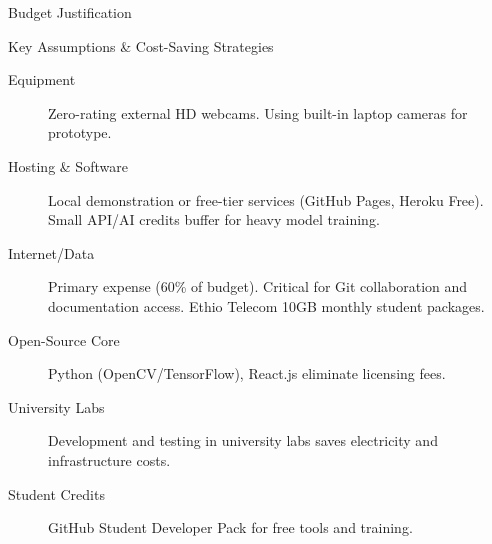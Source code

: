 \begin{frame}{Budget Justification}
    \begin{block}{Key Assumptions \& Cost-Saving Strategies}
        \begin{description}
            \item[Equipment] Zero-rating external HD webcams. Using built-in laptop cameras for prototype.
            
            \item[Hosting \& Software] Local demonstration or free-tier services (GitHub Pages, Heroku Free). Small API/AI credits buffer for heavy model training.
            
            \item[Internet/Data] Primary expense (60\% of budget). Critical for Git collaboration and documentation access. Ethio Telecom 10GB monthly student packages.
            
            \item[Open-Source Core] Python (OpenCV/TensorFlow), React.js eliminate licensing fees.
            
            \item[University Labs] Development and testing in university labs saves electricity and infrastructure costs.
            
            \item[Student Credits] GitHub Student Developer Pack for free tools and training.
        \end{description}
    \end{block}
\end{frame}
